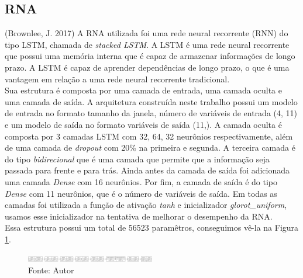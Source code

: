 \documentclass[
	article,			%
	12pt,				%
	a4paper,			%
	chapter=TITLE,		%
	section=TITLE,		%
	subsection=TITLE,	%
	subsubsection=TITLE %
	english,			%
	brazil,				%
	sumario=tradicional
	]{abntex2}
\begin{document}
\subsection{RNA}
(Brownlee, J. 2017) A RNA utilizada foi uma rede neural recorrente (RNN) do tipo LSTM, chamada de \textit{stacked LSTM}. A LSTM é uma rede neural recorrente que possui uma memória interna que é capaz de armazenar informações de longo prazo. A LSTM é capaz de aprender dependências de longo prazo, o que é uma vantagem em relação a uma rede neural recorrente tradicional.
\\ \indent
Sua estrutura é composta por uma camada de entrada, uma camada oculta e uma camada de saída. A arquitetura construída neste trabalho possui um modelo de entrada no formato tamanho da janela, número de variáveis de entrada (4, 11) e um modelo de saída no formato variáveis de saída (11,). A camada oculta é composta por 3 camadas LSTM com 32, 64, 32 neurônios respectivamente, além de uma camada de \textit{dropout} com 20\% na primeira e segunda. A terceira camada é do tipo \textit{bidirecional} que é uma camada que permite que a informação seja passada para frente e para trás. Ainda antes da camada de saída foi adicionada uma camada \textit{Dense} com 16 neurônios. Por fim, a camada de saída é do tipo \textit{Dense} com 11 neurônios, que é o número de variáveis de saída. Em todas as camadas foi utilizada a função de ativação \textit{tanh} e inicializador \textit{glorot\_uniform}, usamos esse inicializador na tentativa de melhorar o desempenho da RNA. 
\\ \indent
Essa estrutura possui um total de 56523 paramêtros, conseguimos vê-la na Figura \ref{figure3}.

\begin{figure}[htbp]
	\centering
	\includegraphics[width=0.5\textwidth]{imagens/imgCodigos/melhorLSTM.png}
	\caption{Fonte: Autor}
	\label{figure3}
\end{figure}
\end{document}
